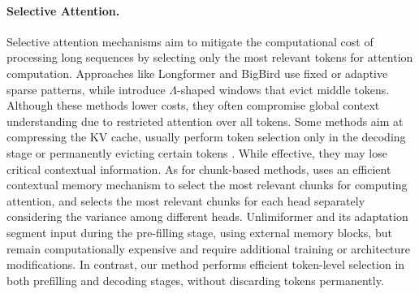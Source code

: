 \paragraph{Selective Attention.}
Selective attention mechanisms aim to mitigate the computational cost of processing long sequences by selecting only the most relevant tokens for attention computation. Approaches like Longformer \citep{Beltagy2020LongformerTL} and BigBird \citep{Zaheer2020BigBT} use fixed or adaptive sparse patterns, while \citealp{han2023lm, xiao2023efficient} introduce $\Lambda$-shaped windows that evict middle tokens. Although these methods lower costs, they often compromise global context understanding due to restricted attention over all tokens.
Some methods aim at compressing the KV cache, usually perform token selection only in the decoding stage \citep{zhang2024h2o,liu2024scissorhands,ge2023model} or permanently evicting certain tokens \citep{xiao2023efficient, han2023lm, li2024snapkv}. While effective, they may lose critical contextual information.
As for chunk-based methods, \citealp{xiao2024infllm} uses an efficient contextual memory mechanism to select the most relevant chunks for computing attention, and \citealp{lu2024longheads} selects the most relevant chunks for each head separately considering the variance among different heads.
Unlimiformer and its adaptation \citep{bertsch2024unlimiformer,ahrabian2024adaptation} segment input during the pre-filling stage, using external memory blocks, but remain computationally expensive and require additional training or architecture modifications.
In contrast, our method performs efficient token-level selection in both prefilling and decoding stages, without discarding tokens permanently.

